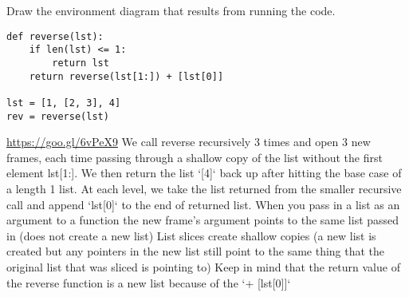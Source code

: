 \begin{blocksection}
\question Draw the environment diagram that results from running the code.

\begin{lstlisting}
def reverse(lst):
    if len(lst) <= 1:
        return lst
    return reverse(lst[1:]) + [lst[0]]

lst = [1, [2, 3], 4]
rev = reverse(lst)
\end{lstlisting}

\begin{solution}[2in]
\url{https://goo.gl/6vPeX9}
We call reverse recursively 3 times and open 3 new frames, each time passing through a shallow copy of the list without the first element lst[1:]. We then return the list `[4]` back up after hitting the base case of a length 1 list. At each level, we take the list returned from the smaller recursive call and append `lst[0]` to the end of returned list.
When you pass in a list as an argument to a function the new frame’s argument points to the same list passed in (does not create a new list)
List slices create shallow copies (a new list is created but any pointers in the new list still point to the same thing that the original list that was sliced is pointing to)
Keep in mind that the return value of the reverse function is a new list because of the `+ [lst[0]]`

\end{solution}
\end{blocksection}
